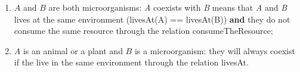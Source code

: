 \begin{itemize}
\begin{itemize}
\begin{enumerate}
            \item $A$ and $B$ are both microorganisms: \textit{A} coexists with \textit{B} means that \textit{A} and \textit{B} lives at the same environment (livesAt(A) == livesAt(B)) \textbf{and} they do not consume the same resource through the relation consumeTheResource;

            \item $A$ is an animal or a plant and $B$ is a microorganism: they will always coexist if the live in the same environment through the relation livesAt.
        \end{enumerate}
        
    \end{itemize}
\end{itemize}